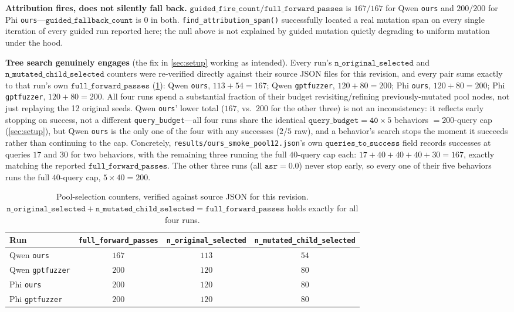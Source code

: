 \documentclass[11pt,letterpaper]{article}
\begin{document}
\textbf{Attribution fires, does not silently fall back.} $\mathtt{guided\_fire\_count} /
\mathtt{full\_forward\_passes}$ is $167/167$ for Qwen \texttt{ours} and $200/200$ for Phi
\texttt{ours}---$\mathtt{guided\_fallback\_count}$ is $0$ in both. \texttt{find\_attribution\_span()}
successfully located a real mutation span on every single iteration of every guided run reported
here; the null above is not explained by guided mutation quietly degrading to uniform mutation
under the hood.

\textbf{Tree search genuinely engages} (the fix in \cref{sec:setup} working as intended). Every
run's $\mathtt{n\_original\_selected}$ and $\mathtt{n\_mutated\_child\_selected}$ counters were
re-verified directly against their source JSON files for this revision, and every pair sums
exactly to that run's own $\mathtt{full\_forward\_passes}$ (\cref{tab:sums}):
Qwen \texttt{ours}, $113 + 54 = 167$; Qwen \texttt{gptfuzzer}, $120 + 80 = 200$; Phi
\texttt{ours}, $120 + 80 = 200$; Phi \texttt{gptfuzzer}, $120 + 80 = 200$. All four runs spend a
substantial fraction of their budget revisiting/refining previously-mutated pool nodes, not just
replaying the 12 original seeds. Qwen \texttt{ours}' lower total ($167$, vs.\ $200$ for the other
three) is not an inconsistency: it reflects early stopping on success, not a different
\texttt{query\_budget}---all four runs share the identical $\mathtt{query\_budget=40} \times 5$
behaviors $= 200$-query cap (\cref{sec:setup}), but Qwen \texttt{ours} is the only one of the
four with any successes ($2/5$ raw), and a behavior's search stops the moment it succeeds rather
than continuing to the cap. Concretely, \texttt{results/ours\_smoke\_pool12.json}'s own
$\mathtt{queries\_to\_success}$ field records successes at queries $17$ and $30$ for two
behaviors, with the remaining three running the full $40$-query cap each: $17 + 40 + 40 + 40 +
30 = 167$, exactly matching the reported $\mathtt{full\_forward\_passes}$. The other three runs
(all $\mathtt{asr}=0.0$) never stop early, so every one of their five behaviors runs the full
$40$-query cap, $5 \times 40 = 200$.

\begin{table}[htbp]
\centering
\caption{Pool-selection counters, verified against source JSON for this revision.
  $\mathtt{n\_original\_selected} + \mathtt{n\_mutated\_child\_selected} =
  \mathtt{full\_forward\_passes}$ holds exactly for all four runs.}
\label{tab:sums}
\begin{tabular}{lccc}
\toprule
Run & \texttt{full\_forward\_passes} & \texttt{n\_original\_selected} & \texttt{n\_mutated\_child\_selected} \\
\midrule
Qwen \texttt{ours} & $167$ & $113$ & $54$ \\
Qwen \texttt{gptfuzzer} & $200$ & $120$ & $80$ \\
Phi \texttt{ours} & $200$ & $120$ & $80$ \\
Phi \texttt{gptfuzzer} & $200$ & $120$ & $80$ \\
\bottomrule
\end{tabular}
\end{table}
\end{document}
